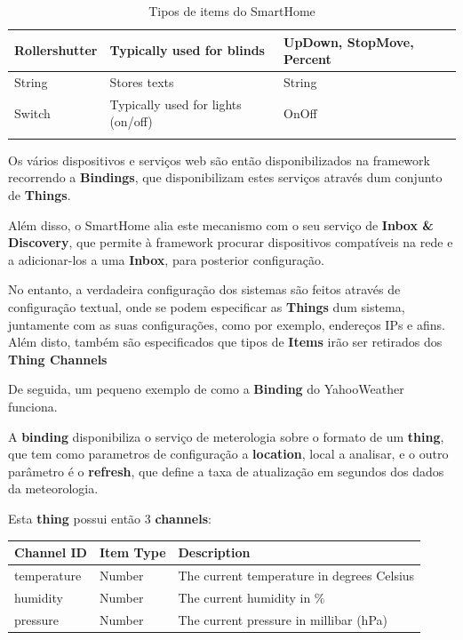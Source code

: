 \begin{table}[H]
{\begin{tabular}{lll}
\multicolumn{1}{|l|}{Rollershutter} & \multicolumn{1}{l|}{Typically used for blinds}                         & \multicolumn{1}{l|}{UpDown, StopMove, Percent}                    \\ \hline
\multicolumn{1}{|l|}{String}        & \multicolumn{1}{l|}{Stores texts}                                      & \multicolumn{1}{l|}{String}                                       \\ \hline
\multicolumn{1}{|l|}{Switch}        & \multicolumn{1}{l|}{Typically used for lights (on/off)}                & \multicolumn{1}{l|}{OnOff}                                        \\ \hline
                                    &                                                                        &
\end{tabular}}
\caption{Tipos de items do SmartHome}
\label{smarthometypes}
\end{table}

Os vários dispositivos e serviços web são então disponibilizados na framework recorrendo a \textbf{Bindings}, que disponibilizam estes serviços através dum conjunto de \textbf{Things}.

Além disso, o SmartHome alia este mecanismo com o seu serviço de \textbf{Inbox \& Discovery}, que permite à framework procurar dispositivos compatíveis na rede e a adicionar-los a uma \textbf{Inbox}, para posterior configuração.

No entanto, a verdadeira configuração dos sistemas são feitos através de configuração textual, onde se podem especificar as \textbf{Things} dum sistema, juntamente com as suas configurações, como por exemplo, endereços IPs e afins. Além disto, também são especificados que tipos de \textbf{Items} irão ser retirados dos \textbf{Thing Channels}

De seguida, um pequeno exemplo de como a \textbf{Binding} do YahooWeather funciona.

A \textbf{binding} disponibiliza o serviço de meterologia sobre o formato de um \textbf{thing}, que tem como parametros de configuração a \textbf{location}, local a analisar, e o outro parâmetro é o \textbf{refresh}, que define a taxa de atualização em segundos dos dados da meteorologia.

Esta \textbf{thing} possui então 3 \textbf{channels}:

\begin{tabular}{lll}
\textbf{Channel ID}                        & \textbf{Item Type}                   & \textbf{Description}                                                     \\ \hline
\multicolumn{1}{|l|}{temperature} & \multicolumn{1}{l|}{Number} & \multicolumn{1}{l|}{The current temperature in degrees Celsius} \\ \hline
\multicolumn{1}{|l|}{humidity}    & \multicolumn{1}{l|}{Number} & \multicolumn{1}{l|}{The current humidity in \%}                 \\ \hline
\multicolumn{1}{|l|}{pressure}    & \multicolumn{1}{l|}{Number} & \multicolumn{1}{l|}{The current pressure in millibar (hPa)}     \\ \hline
\end{tabular}

